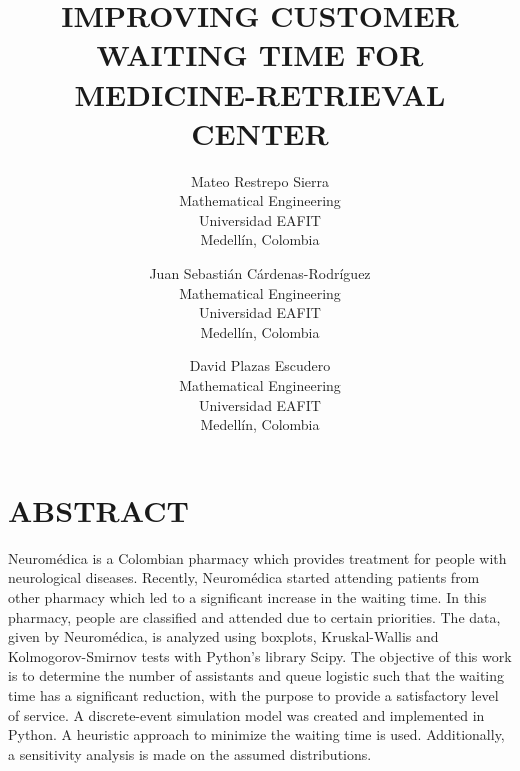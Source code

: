 \documentclass{wscpaperproc}
\theoremstyle{wsc}
\begin{document}
%
%


\title{IMPROVING CUSTOMER WAITING TIME FOR MEDICINE-RETRIEVAL CENTER}

\author{Mateo Restrepo Sierra\\ [12pt]
Mathematical Engineering\\
Universidad EAFIT\\
Medell\'in, Colombia\\
\and
Juan Sebasti\'an C\'ardenas-Rodr\'iguez \\[12pt]
Mathematical Engineering\\
Universidad EAFIT\\
Medell\'in, Colombia\\
\and
David Plazas Escudero\\ [12pt]
Mathematical Engineering\\
Universidad EAFIT\\
Medell\'in, Colombia
}






\maketitle

\section*{ABSTRACT}
Neuromédica is a Colombian pharmacy which provides treatment for people with neurological diseases. Recently, Neuromédica started attending patients from other pharmacy which led to a significant increase in the waiting time. In this pharmacy, people are classified and attended due to certain priorities. The data, given by Neuromédica, is analyzed using boxplots, Kruskal-Wallis and Kolmogorov-Smirnov tests with Python's library Scipy. The objective of this work is to determine the number of assistants and queue logistic such that the waiting time has a significant reduction, with the purpose to provide a satisfactory level of service. A discrete-event simulation model was created and implemented in Python. A heuristic approach to minimize the waiting time is used. Additionally, a sensitivity analysis is made on the assumed distributions.
\end{document}
